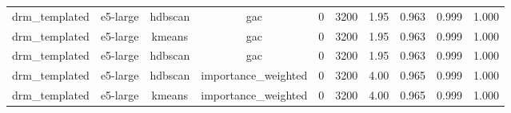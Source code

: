 \begin{longtable}{lccccccccc}
drm\_templated & e5-large & hdbscan & gac & 0 & 3200 & 1.95 & 0.963 & 0.999 & 1.000 \\
drm\_templated & e5-large & kmeans & gac & 0 & 3200 & 1.95 & 0.963 & 0.999 & 1.000 \\
drm\_templated & e5-large & hdbscan & gac & 0 & 3200 & 1.95 & 0.963 & 0.999 & 1.000 \\
drm\_templated & e5-large & hdbscan & importance\_weighted & 0 & 3200 & 4.00 & 0.965 & 0.999 & 1.000 \\
drm\_templated & e5-large & kmeans & importance\_weighted & 0 & 3200 & 4.00 & 0.965 & 0.999 & 1.000 \\
\end{longtable}
